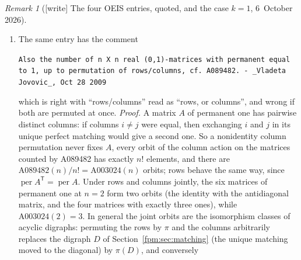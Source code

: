 \documentclass[11pt]{article}
\theoremstyle{definition}\newtheorem{definition}[theorem]{Definition}
\theoremstyle{remark}\newtheorem{remark}[theorem]{Remark}
\newcommand{\Per}{\operatorname{per}}
\begin{document}
\begin{remark}[{[write]} The four OEIS entries, quoted, and the case $k=1$, 6~October 2026]
\begin{enumerate}[label=(\alph*)]
{ at $k=1$ is an instance of this classical asymptotic, not a new result.}
 Indeed $p=\rho$: the equation for $p$ is $E(p)=0$, and A245654
 (revision \#19, 20~September 2026) is the ``\texttt{smallest positive root}'' of that
 function~\cite{oeisrho}, which is $\rho$ by Lemma~\ref{fpm:lem:root}. And $M=a$: since
 $E'(z)=\sum_{m\ge1}(-1)^mz^{m-1}/((m-1)!\,2^{\binom m2})$, the series for
 $M$ is $-\rho E'(\rho)$ term by term, which is~\eqref{fpm:eq:a}. With
 $P_1=1/a$ and~\eqref{fpm:eq:marked}, Theorem~\ref{fpm:thm:main} reads
 $\mathrm{A003024}(n)=n!\,2^{\binom n2}a^{-1}\rho^{-n}\{1+O((\rho/2)^n)\}$,
 the displayed formula with the relative error~\eqref{fpm:eq:relerror} at
 $d=0$. The write's 60-digit values of $\rho$ and $a$ (mpmath) lie in the
 enclosures of Section~\ref{fpm:sec:constants} and agree with the first 55
 of the 103 digits printed in each of A245654 and A245655~\cite{oeisa}
 (revision \#15, 21~January 2015; the further digits were not compared); so $M=0.574\ldots$, not $0.474$.
 \textup{(The independent check of 6~October 2026 compared all 103 digits
 of each entry with $130$-digit values of its own: they agree.)}
\item The same entry has the comment
 \begin{center}\small
 \parbox{0.92\textwidth}{\raggedright\texttt{Also the number of n X n real (0,1)-matrices with permanent equal to 1, up to permutation of rows/columns, cf. A089482. - \_Vladeta Jovovic\_, Oct 28 2009}}
 \end{center}
 which is right with ``rows/columns'' read as ``rows, or columns'', and
 wrong if both are permuted at once. \emph{Proof.} A matrix $A$ of permanent
 one has pairwise distinct columns: if columns $i\ne j$ were equal, then
 exchanging $i$ and $j$ in its unique perfect matching would give a second
 one. So a nonidentity column permutation never fixes $A$, every orbit of
 the column action on the matrices counted by A089482 has exactly $n!$
 elements, and there are $\mathrm{A089482}(n)/n!=\mathrm{A003024}(n)$
 orbits; rows behave the same way, since $\Per A^{\mathsf T}=\Per A$. Under
 rows and columns jointly, the six matrices of permanent one at $n=2$ form
 two orbits (the identity with the antidiagonal matrix, and the four
 matrices with exactly three ones), while $\mathrm{A003024}(2)=3$.
 In general the joint orbits are the isomorphism classes of acyclic
 digraphs: permuting the rows by $\pi$ and the columns arbitrarily replaces
 the digraph $D$ of Section~\ref{fpm:sec:matching} (the unique matching
 moved to the diagonal) by $\pi(D)$, and conversely

\end{enumerate}
\end{remark}
\end{document}
